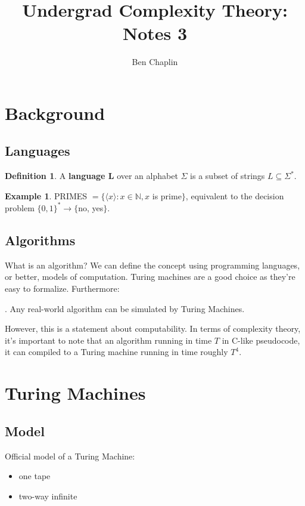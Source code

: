 \documentclass[11pt]{article}
\title{Undergrad Complexity Theory: Notes 3}
\author{Ben Chaplin}
\date{}
\theoremstyle{plain}
\theoremstyle{definition}
\newtheorem*{defn}{Definition}
\newtheorem*{ex}{Example}
\newcommand{\N}{\mathbb{N}}
\begin{document}
\maketitle
\tableofcontents

\section{Background}
\subsection{Languages}

\begin{defn}
	A {\bf language L} over an alphabet $\Sigma$ is a subset of strings $L \subseteq \Sigma^*$.
\end{defn}

\begin{ex}
	PRIMES $= \{\langle x \rangle : x \in \N, x$ is prime$\}$, equivalent to the decision problem $\{0, 1\}^* \rightarrow \{$no, yes$\}$.
\end{ex}

\subsection{Algorithms}

What is an algorithm? We can define the concept using programming languages, or better, models of computation. Turing machines are
a good choice as they're easy to formalize. Furthermore: \medskip

. Any real-world algorithm can be simulated by Turing Machines.\medskip

However, this is a statement about computability. In terms of complexity theory, it's important to note that an algorithm running in
time $T$ in C-like pseudocode, it can compiled to a Turing machine running in time roughly $T^4$.

\section{Turing Machines}
\subsection{Model}

Official model of a Turing Machine:
\begin{itemize}
	\item one tape
	\item two-way infinite
\end{itemize}
\end{document}

